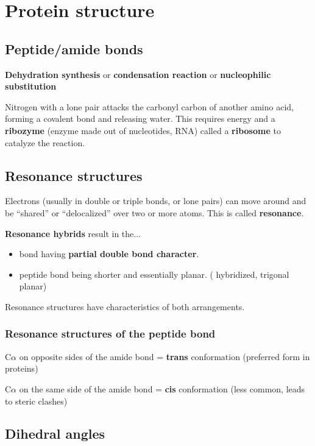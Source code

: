 \documentclass[letterpaper, 12pt]{article}
\begin{document}
\newpage

\section*{Protein structure}

\subsection*{Peptide/amide bonds}

\textbf{Dehydration synthesis} or \textbf{condensation reaction} or \textbf{nucleophilic substitution}

Nitrogen with a lone pair attacks the carbonyl carbon of another amino acid, forming a covalent bond and releasing water. This requires energy and a \textbf{ribozyme} (enzyme made out of nucleotides, RNA) called a \textbf{ribosome} to catalyze the reaction.

\subsection*{Resonance structures}

Electrons (usually in double or triple bonds, or lone pairs) can move around
and be ``shared'' or ``delocalized'' over two or more atoms. This is called \textbf{resonance}.

\textbf{Resonance hybrids} result in the...

\begin{itemize}
\item {} bond having \textbf{partial double bond character}.
\item peptide bond being shorter and essentially planar. ( hybridized, trigonal planar)
\end{itemize}

Resonance structures have characteristics of both arrangements.

\subsubsection*{Resonance structures of the peptide bond}

C$\alpha$ on opposite sides of the amide bond = \textbf{trans} conformation (preferred form in proteins)

C$\alpha$ on the same side of the amide bond = \textbf{cis} conformation (less common, leads to steric clashes)

\subsection*{Dihedral angles}
\end{document}
